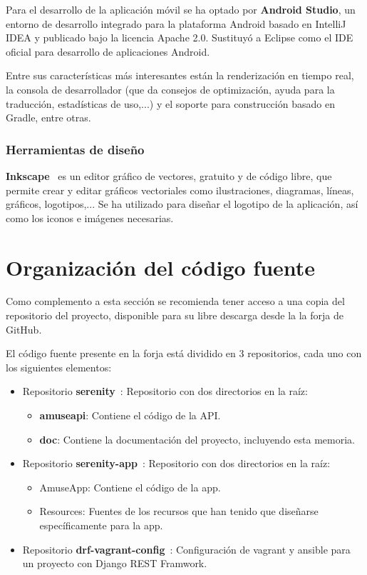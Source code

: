 Para el desarrollo de la aplicación móvil se ha optado por
\textbf{Android Studio},\cite{android-studio} un entorno de desarrollo integrado
para la plataforma Android basado en IntelliJ IDEA y publicado bajo la licencia
Apache 2.0. Sustituyó a Eclipse como el IDE oficial para desarrollo de
aplicaciones Android.

Entre sus características más interesantes están la renderización en tiempo real,
la consola de desarrollador (que da consejos de optimización, ayuda para la
traducción, estadísticas de uso,...) y el soporte para construcción basado en
Gradle, entre otras.


\subsubsection{Herramientas de diseño}

\textbf{Inkscape}~\cite{inkscape} es un editor gráfico de vectores, gratuito y
de código libre, que permite crear y editar gráficos vectoriales como
ilustraciones, diagramas, líneas, gráficos, logotipos,... Se ha utilizado para
diseñar el logotipo de la aplicación, así como los iconos e imágenes necesarias.



\section{Organización del código fuente}

Como complemento a esta sección se recomienda tener acceso a una copia del
repositorio del proyecto, disponible para su libre descarga desde la
la forja de GitHub.

El código fuente presente en la forja está dividido en 3 repositorios, cada uno
con los siguientes elementos:
\begin{itemize}
\item Repositorio \textbf{serenity}~\cite{repo-serenity}: Repositorio con dos
  directorios en la raíz:
  \begin{itemize}
  \item \textbf{amuseapi}: Contiene el código de la API.
  \item \textbf{doc}: Contiene la documentación del proyecto, incluyendo esta
    memoria.
  \end{itemize}
\item Repositorio \textbf{serenity-app}~\cite{repo-serenity-app}: Repositorio con
  dos directorios en la raíz:
  \begin{itemize}
  \item AmuseApp: Contiene el código de la app.
  \item Resources: Fuentes de los recursos que han tenido que diseñarse
    específicamente para la app.
  \end{itemize}
\item Repositorio \textbf{drf-vagrant-config}~\cite{repo-serenity}: Configuración
  de vagrant y ansible para un proyecto con Django REST Framwork.
\end{itemize}



